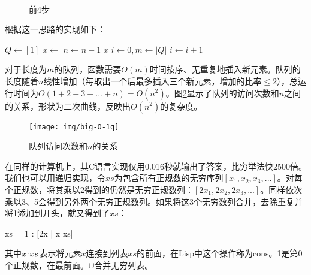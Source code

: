 \documentclass[b5paper]{ctexart}
\begin{document}
\begin{figure}[htbp]
  \centering
  \hspace{.1\textwidth}
  \\
  \hspace{.1\textwidth}
  \caption{前4步}
  \label{fig:queues}
\end{figure}

根据这一思路的实现如下：

\begin{algorithmic}[1]
  \State $Q \gets [1]$
    \State $x \gets$ 
    \State {}
    \State {}
    \State {}
    \State $n \gets n-1$
  \EndWhile
  \State \Return $x$
\EndFunction
\Statex
{}
  \State $i \gets 0, m \gets |Q|$
    \State $i \gets i + 1$
  \EndWhile
    \State {}
  \EndIf
\EndFunction
\end{algorithmic}

对于长度为$m$的队列，函数需要$O(m)$时间按序、无重复地插入新元素。队列的长度随着$n$线性增加（每取出一个后最多插入三个新元素，增加的比率$\leq 2$），总运行时间为$O(1 + 2 + 3 + ... + n) = O(n^2)$。图\ref{fig:big-O-1q}显示了队列的访问次数和$n$之间的关系，形状为二次曲线，反映出$O(n^2)$的复杂度。

\begin{figure}[htbp]
  \centering
  \texttt{[image: img/big-O-1q]}
  \caption{队列访问次数和$n$的关系} \label{fig:big-O-1q}
\end{figure}

在同样的计算机上，其C语言实现仅用0.016秒就输出了答案，比穷举法快2500倍。我们也可以用递归实现，令$xs$为包含所有正规数的无穷序列$[x_1, x_2, x_3, ...]$。对每个正规数，将其乘以2得到的仍然是无穷正规数列：$[2x_1, 2x_2, 2x_3, ...]$。同样依次乘以3、5会得到另外两个无穷正规数列。如果将这3个无穷数列合并，去除重复并将1添加到开头，就又得到了$xs$：

\be
  xs = 1 : [2x | x \gets xs] \cup [3x | x \gets xs] \cup [5x | x \gets xs]
\ee

其中$x \mathbin{\!:\!} xs$表示将元素$x$连接到列表$xs$的前面，在Lisp中这个操作称为cons。1是第0个正规数，在最前面。$\cup$合并无穷列表。
\end{document}
